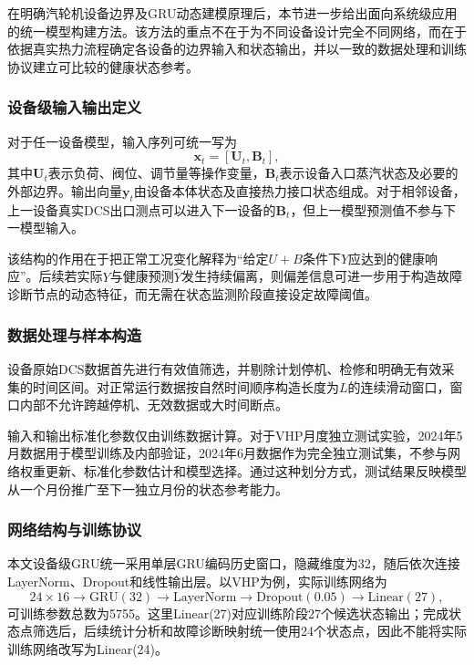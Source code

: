 在明确汽轮机设备边界及GRU动态建模原理后，本节进一步给出面向系统级应用的统一模型构建方法。该方法的重点不在于为不同设备设计完全不同网络，而在于依据真实热力流程确定各设备的边界输入和状态输出，并以一致的数据处理和训练协议建立可比较的健康状态参考。

\subsubsection{设备级输入输出定义}

对于任一设备模型，输入序列可统一写为
\begin{equation}
\mathbf x_t=[\mathbf U_t,\mathbf B_t],
\end{equation}
其中$\mathbf U_t$表示负荷、阀位、调节量等操作变量，$\mathbf B_t$表示设备入口蒸汽状态及必要的外部边界。输出向量$\mathbf y_t$由设备本体状态及直接热力接口状态组成。对于相邻设备，上一设备真实DCS出口测点可以进入下一设备的$\mathbf B_t$，但上一模型预测值不参与下一模型输入。

该结构的作用在于把正常工况变化解释为“给定$U+B$条件下$Y$应达到的健康响应”。后续若实际$Y$与健康预测$\hat Y$发生持续偏离，则偏差信息可进一步用于构造故障诊断节点的动态特征，而无需在状态监测阶段直接设定故障阈值。

\subsubsection{数据处理与样本构造}

设备原始DCS数据首先进行有效值筛选，并剔除计划停机、检修和明确无有效采集的时间区间。对正常运行数据按自然时间顺序构造长度为$L$的连续滑动窗口，窗口内部不允许跨越停机、无效数据或大时间断点。

输入和输出标准化参数仅由训练数据计算。对于VHP月度独立测试实验，2024年5月数据用于模型训练及内部验证，2024年6月数据作为完全独立测试集，不参与网络权重更新、标准化参数估计和模型选择。通过这种划分方式，测试结果反映模型从一个月份推广至下一独立月份的状态参考能力。

\subsubsection{网络结构与训练协议}

本文设备级GRU统一采用单层GRU编码历史窗口，隐藏维度为32，随后依次连接LayerNorm、Dropout和线性输出层。以VHP为例，实际训练网络为
\begin{equation}
24\times16\rightarrow \mathrm{GRU}(32)\rightarrow \mathrm{LayerNorm}\rightarrow \mathrm{Dropout}(0.05)\rightarrow \mathrm{Linear}(27),
\end{equation}
可训练参数总数为5755。这里Linear(27)对应训练阶段27个候选状态输出；完成状态点筛选后，后续统计分析和故障诊断映射统一使用24个状态点，因此不能将实际训练网络改写为Linear(24)。

